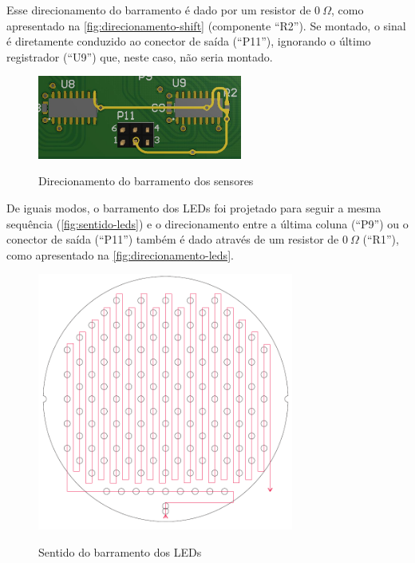 Esse direcionamento do barramento é dado por um resistor de {$0\ \Omega$}, como apresentado na \autoref{fig:direcionamento-shift} (componente ``R2''). Se montado, o sinal é diretamente conduzido ao conector de saída (``P11''), ignorando o último registrador (``U9'') que, neste caso, não seria montado.

\begin{figure}[H]
    \centering
    \caption{Direcionamento do barramento dos sensores}
    \includegraphics[width=0.6\textwidth]{./dados/figuras/res-dir-shift}
    \label{fig:direcionamento-shift}
\end{figure}

De iguais modos, o barramento dos LEDs foi projetado para seguir a mesma sequência (\autoref{fig:sentido-leds}) e o direcionamento entre a última coluna (``P9'') ou o conector de saída (``P11'') também é dado através de um resistor de {$0\ \Omega$} (``R1''), como apresentado na \autoref{fig:direcionamento-leds}.

\begin{figure}[H]
    \centering
    \caption{Sentido do barramento dos LEDs}
    \includegraphics[width=0.75\textwidth]{./dados/figuras/sentido-leds}
    \label{fig:sentido-leds}
\end{figure}

